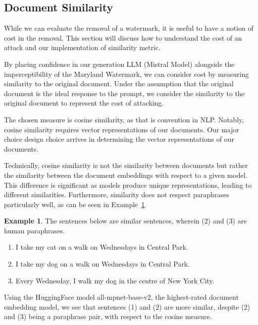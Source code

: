 \documentclass{l4proj}
\theoremstyle{definition}
\newtheorem{example}{Example}[section]
\newcommand{\codefont}[1]{{\fontfamily{lmtt}\selectfont #1}}
\begin{document}
    \subsection{Document Similarity}
        \label{sec:document-similarity}
        While we can evaluate the removal of a watermark, it is useful to have a notion of cost in the removal. This section will discuss how to understand the cost of an attack and our implementation of similarity metric.

        By placing confidence in our generation LLM (Mistral Model) alongside the imperceptibility of the Maryland Watermark, we can consider cost by measuring similarity to the original document. Under the assumption that the original document is the ideal response to the prompt, we consider the similarity to the original document to represent the cost of attacking.

        The chosen measure is cosine similarity, as that is convention in NLP. Notably, cosine similarity requires vector representations of our documents. Our major choice design choice arrives in determining the vector representations of our documents. 

        Technically, cosine similarity is not the similarity between documents but rather the similarity between the document embeddings with respect to a given model. This difference is significant as models produce unique representations, leading to different similarities. Furthermore, similarity does not respect paraphrases particularly well, as can be seen in Example~\ref{example:paraphrase-vs-paragraph}.

        \begin{example}
            \label{example:paraphrase-vs-paragraph}
            The sentences below are similar sentences, wherein (2) and (3) are human paraphrases.
            \begin{enumerate}[label=(\arabic*)]
                \item I take my cat on a walk on Wednesdays in Central Park.
                \item I take my dog on a walk on Wednesdays in Central Park.
                \item Every Wednesday, I walk my dog in the centre of New York City.
            \end{enumerate}
            Using the HuggingFace model \codefont{all-mpnet-base-v2}, the highest-rated document embedding model, we see that sentences (1) and (2) are more similar, despite (2) and (3) being a paraphrase pair, with respect to the cosine measure.
        \end{example}
\end{document}

